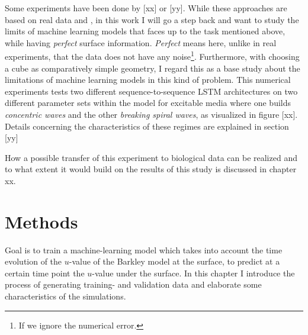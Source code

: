 
Some experiments have been done by [xx] or [yy]. While these approaches are based on real data and , in this work I will go a step back and want to study the limits of machine learning models that faces up to the task mentioned above, while having \textit{perfect} surface information. \textit{Perfect} means here, unlike in real experiments, that the data does not have any noise\footnote{If we ignore the numerical error.}. Furthermore, with choosing a cube as comparatively simple geometry, I regard this as a base study about the limitations of machine learning models in this kind of problem. This numerical experiments tests two different sequence-to-sequence LSTM architectures on two different parameter sets within the model for excitable media where one builds \textit{concentric waves} and the other \textit{breaking spiral waves}, as visualized in figure [xx]. Details concerning the characteristics of these regimes are explained in section [yy]

How a possible transfer of this experiment to biological data can be realized and to what extent it would build on the results of this study is discussed in chapter xx.







\section{Methods}\label{cap:diver_methods}
Goal is to train a machine-learning model which takes into account the time evolution of the $u$-value of the Barkley model \cite{Barkley_2008} at the surface, to predict at a certain time point the $u$-value under the surface. In this chapter I introduce the process of generating training- and validation data and elaborate some characteristics of the simulations.


